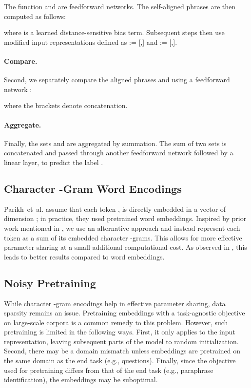 \documentclass[11pt,letterpaper]{article}
\begin{document}
The function  and  are feedforward networks. The self-aligned phrases are then computed as follows:

where  is a learned distance-sensitive bias term. Subsequent steps then use modified input representations defined as  := [,] and  := [,].
\paragraph{Compare.}  Second, we separately compare the aligned phrases  and  using a feedforward network :

where the brackets  denote concatenation. 

\paragraph{Aggregate.} Finally, the sets  and  are aggregated by summation. The sum of two sets is concatenated and passed through another feedforward network followed by a linear layer, to predict the label .

\subsection{Character -Gram Word Encodings}
Parikh~et~al.\nocite{parikh.etal.2016} assume that each token ,  is directly embedded in a vector of dimension ; in practice, they used pretrained word embeddings.
Inspired by prior work mentioned in , we use an alternative approach and instead represent each token as a sum of its embedded character -grams. This allows for more effective parameter sharing at a small additional computational cost.  As observed in , this leads to better results compared to word embeddings.

\subsection{Noisy Pretraining}
While character -gram encodings help in effective parameter sharing, data sparsity remains an issue.
Pretraining embeddings with a task-agnostic objective on large-scale corpora \cite{pennington2014glove} is a common remedy to this problem.
However, such pretraining is limited in the following ways. First, it only applies to the input representation, leaving subsequent parts of the model to random initialization. Second, there may be a domain mismatch unless embeddings are pretrained on the same domain as the end task (e.g., questions). Finally, since the objective used for pretraining differs from that of the end task (e.g., paraphrase identification), the embeddings may be suboptimal.
\end{document}
